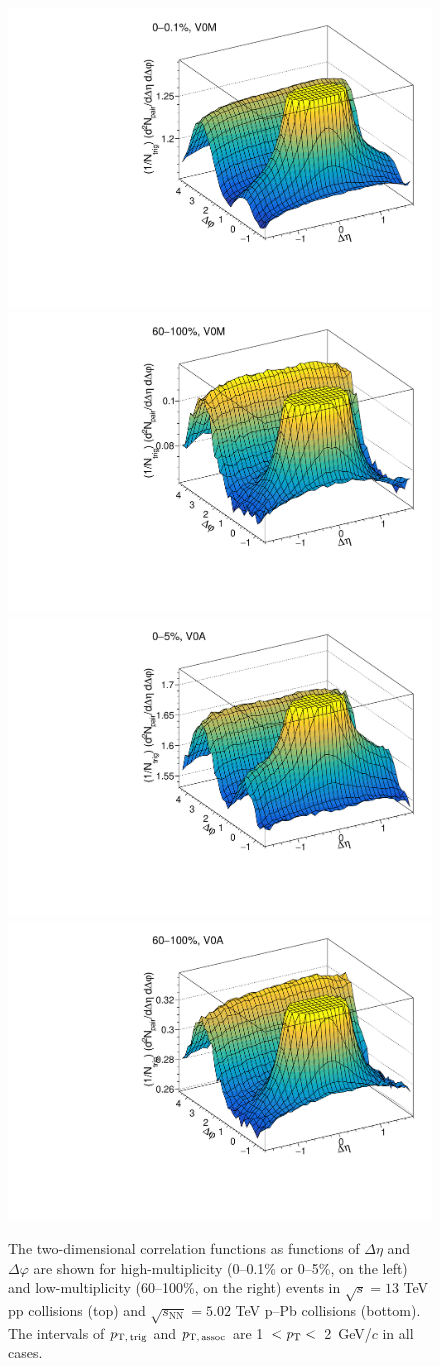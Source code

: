 \begin{figure}[h!]
		\includegraphics[width=0.5 \textwidth]{figures/Fig1_ppHigh.pdf} 
		\includegraphics[width=0.5 \textwidth]{figures/Fig1_ppLow.pdf} 
  		\includegraphics[width=0.5 \textwidth]{figures/Fig1_pPbHigh.pdf}
		\includegraphics[width=0.5 \textwidth]{figures/Fig1_pPbLow.pdf}
\caption{The two-dimensional correlation functions as functions of $\Delta\eta$ and $\Delta\varphi$ are shown for high-multiplicity (0--0.1\% or 0--5\%, on the left) and low-multiplicity (60--100\%, on the right) events in $\sqrt{s}=13$ TeV pp collisions (top) and $\sqrt{s_{\mathrm{NN}}}=5.02$ TeV p--Pb collisions (bottom). The intervals of $p_\mathrm{T,\,trig}$ and $p_\mathrm{T,\,assoc}$ are 1~$<\it{p}_{\rm{T}}<$~2~GeV/$c$ in all cases.}
\label{fig:doubleridge}
\end{figure}

